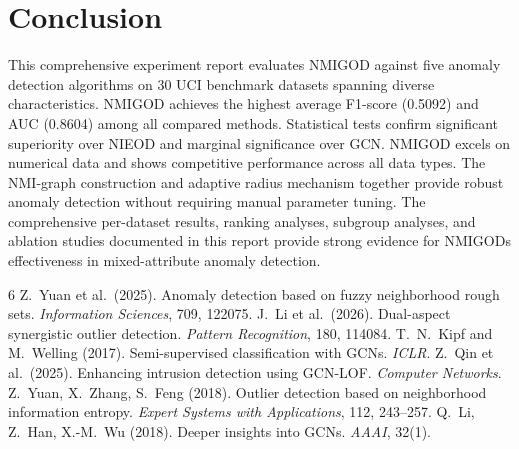 \documentclass[11pt,a4paper]{article}
\begin{document}
\section{Conclusion}
This comprehensive experiment report evaluates NMIGOD against five anomaly detection algorithms on 30 UCI benchmark datasets spanning diverse characteristics. NMIGOD achieves the highest average F1-score (0.5092) and AUC (0.8604) among all compared methods. Statistical tests confirm significant superiority over NIEOD and marginal significance over GCN. NMIGOD excels on numerical data and shows competitive performance across all data types. The NMI-graph construction and adaptive radius mechanism together provide robust anomaly detection without requiring manual parameter tuning. The comprehensive per-dataset results, ranking analyses, subgroup analyses, and ablation studies documented in this report provide strong evidence for NMIGODs effectiveness in mixed-attribute anomaly detection.

\begin{thebibliography}{6}
 Z.~Yuan et al.\ (2025). Anomaly detection based on fuzzy neighborhood rough sets. \textit{Information Sciences}, 709, 122075.
 J.~Li et al.\ (2026). Dual-aspect synergistic outlier detection. \textit{Pattern Recognition}, 180, 114084.
 T.~N.~Kipf and M.~Welling (2017). Semi-supervised classification with GCNs. \textit{ICLR}.
 Z.~Qin et al.\ (2025). Enhancing intrusion detection using GCN-LOF. \textit{Computer Networks}.
 Z.~Yuan, X.~Zhang, S.~Feng (2018). Outlier detection based on neighborhood information entropy. \textit{Expert Systems with Applications}, 112, 243--257.
 Q.~Li, Z.~Han, X.-M.~Wu (2018). Deeper insights into GCNs. \textit{AAAI}, 32(1).
\end{thebibliography}
\end{document}
